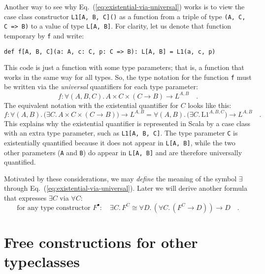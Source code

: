 Another way to see why Eq.~(\ref{eq:existential-via-universal})
works is to view the case class constructor \lstinline!L1[A, B, C]()!
as a function from a triple of type \lstinline!(A, C, C => B)!
to a value of type \lstinline!L[A, B]!.
For clarity, let us denote that function temporary by \lstinline!f!
and write:
\begin{lstlisting}
def f[A, B, C](a: A, c: C, p: C => B): L[A, B] = L1(a, c, p) 
\end{lstlisting}
This code is just a function with some type parameters; that is, a
function that works in the same way for all types. So, the type notation
for the function \lstinline!f!
must be written via the \emph{universal} quantifiers for each type
parameter:
\[
f:\forall(A,B,C).\,A\times C\times(C\rightarrow B)\rightarrow L^{A,B}\quad.
\]
The equivalent notation with the existential quantifier for $C$ looks
like this:
\[
f:\forall(A,B).\,\big(\exists C.\,A\times C\times(C\rightarrow B)\big)\rightarrow L^{A,B}=\forall(A,B).\,\big(\exists C.\,\text{L1}^{A,B,C})\rightarrow L^{A,B}\quad.
\]
This explains why the existential quantifier is represented in Scala
by a case class with an extra type parameter, such as \lstinline!L1[A, B, C]!.
The type parameter \lstinline!C!
is existentially quantified because it does not appear in \lstinline!L[A, B]!,
while the two other parameters (\lstinline!A!
and \lstinline!B!) do appear
in \lstinline!L[A, B]!
and are therefore universally quantified.

Motivated by these considerations, we may \emph{define} the meaning
of the symbol $\exists$ through Eq.~(\ref{eq:existential-via-universal}).
Later we will derive another formula that expresses $\exists C$ via
$\forall C$: 
\[
\text{for any type constructor }F^{\bullet}:\quad\exists C.\,F^{C}\cong\forall D.\,(\forall C.\,(F^{C}\rightarrow D))\rightarrow D\quad.
\]


\section{Free constructions for other typeclasses}

